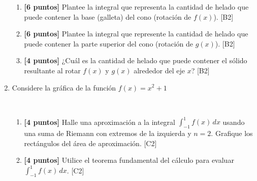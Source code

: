 \documentclass[10pt]{exam}
\begin{document}
\begin{enumerate}
\begin{enumerate}
   \item \textbf{[6 puntos]} Plantee la integral que representa la cantidad de helado que puede contener la  base (galleta) del cono (rotación de $f(x)$). \hfill{[B2]}

   \item \textbf{[6 puntos]} Plantee la integral que represente la cantidad de helado que puede contener la parte superior del cono (rotación de $g(x)$). \hfill{[B2]}
    
   \item \textbf{[4 puntos]} ¿Cuál es la cantidad de helado que puede contener el sólido resultante al rotar $f(x)$ y $g(x)$ alrededor del eje $x$?  \hfill{[B2]}
    
    
\end{enumerate}

\newpage
\item Considere la gráfica de la función $f(x)=x^2+1$

\begin{center}
\\

\end{center}



\begin{enumerate}
    \item \textbf{[4 puntos]}  Halle una aproximación a la integral     $\displaystyle{\int_{-1}^{1}f(x)\, dx}$ usando una suma de Riemann con extremos de la izquierda y $n=2$.  Grafique los rectángulos del área de aproximación. \hfill{[C2]}

   

     \item \textbf{[4 puntos]} Utilice el teorema fundamental del cálculo para evaluar  $\displaystyle{\int_{-1}^{1}f(x)\, dx}$. \hfill{[C2]}
     

\end{enumerate}
\end{enumerate}
\end{document}
